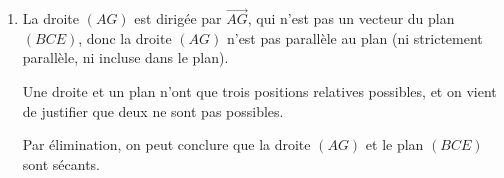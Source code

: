 \documentclass[10pt]{article}
\providecommand{\vect}[1]{\overrightarrow{#1}}
\begin{document}
\begin{enumerate}
\begin{enumerate}
On a :
\[
\vect{AG}\begin{pmatrix}5\\1\\1\end{pmatrix}.
\]
Donc :
\[
\begin{aligned}
\vect{AG}=a\vect{BC}+b\vect{BE}
&\Longleftrightarrow
\begin{cases}
2a+b=5\\
a-4b=1\\
2a-b=1
\end{cases}\\
&\Longleftrightarrow
\begin{cases}
b=5-2a\\
a-4(5-2a)=1\\
2a-(5-2a)=1
\end{cases}\\
&\Longleftrightarrow
\begin{cases}
b=5-2a\\
9a-20=1\\
4a-5=1
\end{cases}\\
&\Longleftrightarrow
\begin{cases}
b=5-2a\\
9a=21\\
4a=6
\end{cases}\\
&\Longleftrightarrow
\begin{cases}
b=5-2a\\
a=\dfrac73\\
a=\dfrac32.
\end{cases}
\end{aligned}
\]
Les équations du système ne sont pas compatibles.

Donc le système n'a pas de solution.

Donc les vecteurs $\vect{BE}$, $\vect{BC}$ et $\vect{AG}$ ne sont pas coplanaires.

\item La droite $(AG)$ est dirigée par $\vect{AG}$, qui n'est pas un vecteur du plan $(BCE)$, donc la droite $(AG)$ n'est pas parallèle au plan (ni strictement parallèle, ni incluse dans le plan).

Une droite et un plan n'ont que trois positions relatives possibles, et on vient de justifier que deux ne sont pas possibles.

Par élimination, on peut conclure que la droite $(AG)$ et le plan $(BCE)$ sont sécants.
\end{enumerate}


\end{enumerate}
\end{document}
